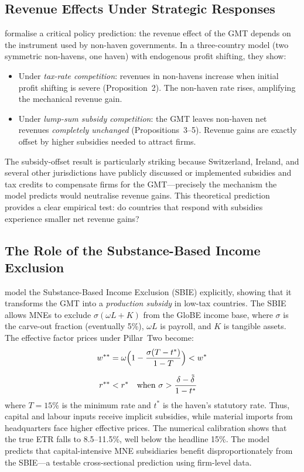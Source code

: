 \documentclass[11pt,a4paper]{article}
\begin{document}
\subsection{Revenue Effects Under Strategic Responses}
\label{subsec:janeba}

\citet{janeba2023} formalise a critical policy prediction: the revenue effect of the GMT depends on the instrument used by non-haven governments. In a three-country model (two symmetric non-havens, one haven) with endogenous profit shifting, they show:
\begin{itemize}[nosep]
    \item Under \emph{tax-rate competition}: revenues in non-havens increase when initial profit shifting is severe (Proposition~2). The non-haven rate rises, amplifying the mechanical revenue gain.
    \item Under \emph{lump-sum subsidy competition}: the GMT leaves non-haven net revenues \emph{completely unchanged} (Propositions~3--5). Revenue gains are exactly offset by higher subsidies needed to attract firms.
\end{itemize}
The subsidy-offset result is particularly striking because Switzerland, Ireland, and several other jurisdictions have publicly discussed or implemented subsidies and tax credits to compensate firms for the GMT---precisely the mechanism the model predicts would neutralise revenue gains. This theoretical prediction provides a clear empirical test: do countries that respond with subsidies experience smaller net revenue gains?

\subsection{The Role of the Substance-Based Income Exclusion}
\label{subsec:schjelderup}

\citet{schjelderup2024} model the Substance-Based Income Exclusion (SBIE) explicitly, showing that it transforms the GMT into a \emph{production subsidy} in low-tax countries. The SBIE allows MNEs to exclude $\sigma(\omega L + K)$ from the GloBE income base, where $\sigma$ is the carve-out fraction (eventually 5\%), $\omega L$ is payroll, and $K$ is tangible assets. The effective factor prices under Pillar~Two become:
\begin{align}
w^{**} &= \omega\Bigl(1 - \frac{\sigma(T - t^*)}{1-T}\Bigr) < w^* \label{eq:sbie_wage}\\[6pt]
r^{**} &< r^* \quad \text{when } \sigma > \frac{\delta - \tilde{\delta}}{1-t^*}  \label{eq:sbie_capital}
\end{align}
where $T = 15\%$ is the minimum rate and $t^*$ is the haven's statutory rate. Thus, capital and labour inputs receive implicit subsidies, while material imports from headquarters face higher effective prices. The numerical calibration shows that the true ETR falls to 8.5--11.5\%, well below the headline 15\%. The model predicts that capital-intensive MNE subsidiaries benefit disproportionately from the SBIE---a testable cross-sectional prediction using firm-level data.
\end{document}
